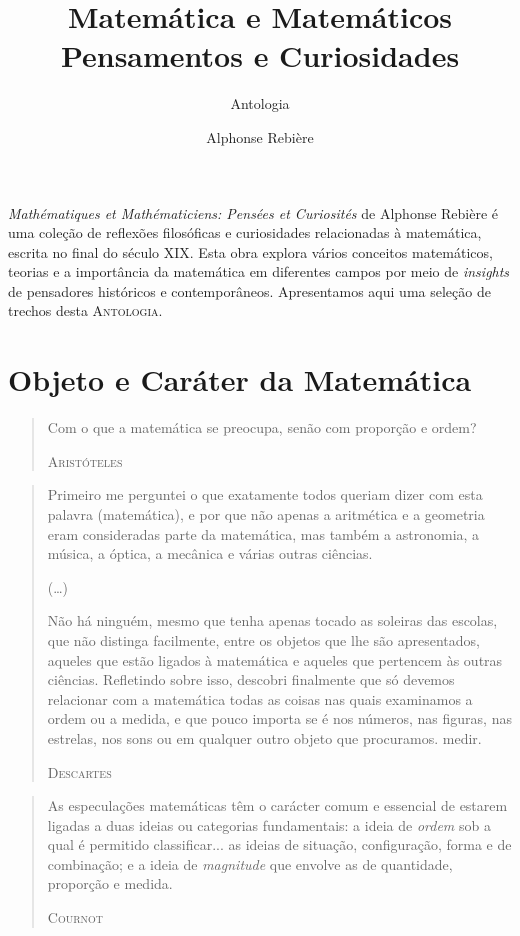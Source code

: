 \documentclass{hipatia}
\title{Matemática e Matemáticos\\
Pensamentos e Curiosidades}
\subtitle{Antologia}
\author{Alphonse Rebière}
\begin{document}
\setcounter{page}{\antologiapage}
\maketitle
\emph{Mathématiques et Mathématiciens: Pensées et Curiosités} de Alphonse Rebière é uma coleção de reflexões filosóficas e curiosidades relacionadas à matemática, escrita no final do século XIX. Esta obra explora vários conceitos matemáticos, teorias e a importância da matemática em diferentes campos por meio de \emph{insights} de pensadores históricos e contemporâneos. 
Apresentamos aqui uma seleção de trechos desta \textsc{Antologia}.


\section{Objeto e Caráter da Matemática}

\begin{quote}
Com o que a matemática se preocupa, senão com proporção e ordem?

\hfill \textsc{Aristóteles}
\end{quote}
 
\begin{quote}
Primeiro me perguntei o que exatamente todos queriam dizer com esta palavra (matemática), e por que não apenas a aritmética e a geometria eram consideradas parte da matemática, mas também a astronomia, a música, a óptica, a mecânica e várias outras ciências.

(\dots)

Não há ninguém, mesmo que tenha apenas tocado as soleiras das escolas, que não distinga facilmente, entre os objetos que lhe são apresentados, aqueles que estão ligados à matemática e aqueles que pertencem às outras ciências. Refletindo sobre isso, descobri finalmente que só devemos relacionar com a matemática todas as coisas nas quais examinamos a ordem ou a medida, e que pouco importa se é nos números, nas figuras, nas estrelas, nos sons ou em qualquer outro objeto que procuramos. medir.

\hfill \textsc{Descartes}
\end{quote}
 
\begin{quote}
As especulações matemáticas têm o carácter comum e essencial de estarem ligadas a duas ideias ou categorias fundamentais: a ideia de \emph{ordem} sob a qual é permitido classificar... as ideias de situação, configuração, forma e de combinação; e a ideia de \emph{magnitude} que envolve as de quantidade, proporção e medida.

\hfill \textsc{Cournot}
\end{quote}
\end{document}
